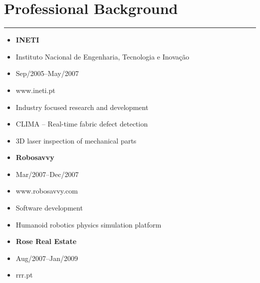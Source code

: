 \documentclass[a4paper,english]{article}
\newcommand{\topic}[1]{
\section*{#1} \vspace{-6mm}
\rule{\columnwidth}{.25mm}
}
\begin{document}
\topic{Professional Background}
\vspace{0.5cm}
\begin{minipage}[t]{0.5\linewidth}
    \begin{itemize}
    \setlength{\itemsep}{-1mm}
        \item[] {\bf INETI}
        \item[] Instituto Nacional de Engenharia, Tecnologia e Inovação
        \item[] Sep/2005--May/2007
        \item[] www.ineti.pt
    \end{itemize}
\end{minipage}
\begin{minipage}[t]{0.5\linewidth}
    \begin{itemize}
    \setlength{\itemsep}{-1mm}
        \item[] Industry focused research and development
        \item[] CLIMA -- Real-time fabric defect detection
        \item[] 3D laser inspection of mechanical parts
    \end{itemize}
\end{minipage}
\vspace{0.5cm}
\begin{minipage}[t]{0.5\linewidth}
    \begin{itemize}
    \setlength{\itemsep}{-1mm}
        \item[] {\bf Robosavvy}
        \item[] Mar/2007--Dec/2007
        \item[] www.robosavvy.com
    \end{itemize}
\end{minipage}
\begin{minipage}[t]{0.5\linewidth}
    \begin{itemize}
    \setlength{\itemsep}{-1mm}
        \item[] Software development
        \item[] Humanoid robotics physics simulation platform
    \end{itemize}
\end{minipage}
\vspace{0.5cm}
\begin{minipage}[t]{0.5\linewidth}
    \begin{itemize}
    \setlength{\itemsep}{-1mm}
        \item[] {\bf Rose Real Estate}
        \item[] Aug/2007--Jan/2009
        \item[] rrr.pt
    \end{itemize}
\end{minipage}
\end{document}

